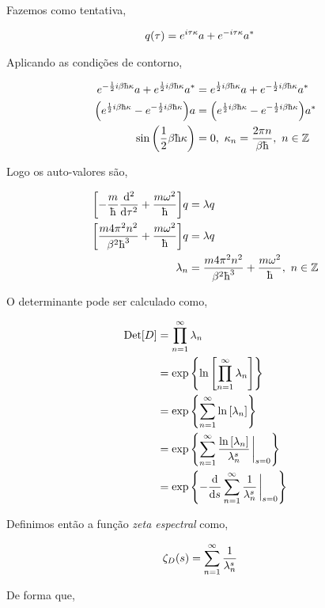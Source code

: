 \documentclass[twoside]{amsart}
\newcommand{\Det}[1]{\textup{Det} #1}
\numberwithin{equation}{section}
\begin{document}
Fazemos como tentativa,

\begin{align}
    q\qty(\tau)&=e^{i\tau\kappa}a+e^{-i\tau\kappa}a^\ast
\end{align}

Aplicando as condições de contorno,

\begin{align}
    e^{-\frac12i\beta\hbar\kappa}a+e^{\frac12i\beta\hbar\kappa}a^\ast&=e^{\frac12i\beta\hbar\kappa}a+e^{-\frac12i\beta\hbar\kappa}a^\ast\\
    \qty(e^{\frac12i\beta\hbar\kappa}-e^{-\frac12i\beta\hbar\kappa})a&=\qty(e^{\frac12i\beta\hbar\kappa}-e^{-\frac12i\beta\hbar\kappa})a^\ast\\
    \sin\qty(\frac12\beta\hbar\kappa)&=0,\ \kappa_n=\frac{2\pi n}{\beta\hbar},\ n\in\mathbb Z
\end{align}

Logo os auto-valores são,

\begin{align}
    \qty[-\frac m\hbar \dv[2]{}{\tau}+\frac{m\omega^2}{\hbar}]q&=\lambda q\\
    \qty[\frac{m4\pi^2n^2}{\beta^2\hbar^3}+\frac{m\omega^2}{\hbar}]q&=\lambda q\\
    \lambda_n&=\frac{m4\pi^2n^2}{\beta^2\hbar^3}+\frac{m\omega^2}{\hbar},\ n\in\mathbb Z
\end{align}

O determinante pode ser calculado como,

\begin{align}
    \Det\qty[D]&=\prod\limits_{n=1}^{\infty}\lambda_n\\
    &=\exp\qty{\ln\qty[\prod\limits_{n=1}^{\infty}\lambda_n]}\\
    &=\exp\qty{\sum\limits_{n=1}^{\infty}\ln\qty[\lambda_n]}\\
    &=\exp\qty{\sum\limits_{n=1}^{\infty}\frac{\ln\qty[\lambda_n]}{\lambda_n^s}\eval_{s=0}}\\
    &=\exp\qty{-\dv{}{s}\sum\limits_{n=1}^{\infty}\frac{1}{\lambda_n^s}\eval_{s=0}}
\end{align}

Definimos então a função \emph{zeta espectral} como,

\begin{align}
    \zeta_D\qty(s)&=\sum\limits_{n=1}^{\infty}\frac{1}{\lambda_n^s}
\end{align}

De forma que,
\end{document}
